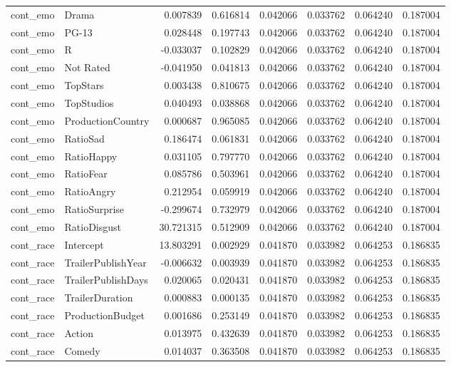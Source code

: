 \begin{tabular}{llrrrrrr}
cont_emo & Drama & 0.007839 & 0.616814 & 0.042066 & 0.033762 & 0.064240 & 0.187004 \\
cont_emo & PG-13 & 0.028448 & 0.197743 & 0.042066 & 0.033762 & 0.064240 & 0.187004 \\
cont_emo & R & -0.033037 & 0.102829 & 0.042066 & 0.033762 & 0.064240 & 0.187004 \\
cont_emo & Not Rated & -0.041950 & 0.041813 & 0.042066 & 0.033762 & 0.064240 & 0.187004 \\
cont_emo & TopStars & 0.003438 & 0.810675 & 0.042066 & 0.033762 & 0.064240 & 0.187004 \\
cont_emo & TopStudios & 0.040493 & 0.038868 & 0.042066 & 0.033762 & 0.064240 & 0.187004 \\
cont_emo & ProductionCountry & 0.000687 & 0.965085 & 0.042066 & 0.033762 & 0.064240 & 0.187004 \\
cont_emo & RatioSad & 0.186474 & 0.061831 & 0.042066 & 0.033762 & 0.064240 & 0.187004 \\
cont_emo & RatioHappy & 0.031105 & 0.797770 & 0.042066 & 0.033762 & 0.064240 & 0.187004 \\
cont_emo & RatioFear & 0.085786 & 0.503961 & 0.042066 & 0.033762 & 0.064240 & 0.187004 \\
cont_emo & RatioAngry & 0.212954 & 0.059919 & 0.042066 & 0.033762 & 0.064240 & 0.187004 \\
cont_emo & RatioSurprise & -0.299674 & 0.732979 & 0.042066 & 0.033762 & 0.064240 & 0.187004 \\
cont_emo & RatioDisgust & 30.721315 & 0.512909 & 0.042066 & 0.033762 & 0.064240 & 0.187004 \\
cont_race & Intercept & 13.803291 & 0.002929 & 0.041870 & 0.033982 & 0.064253 & 0.186835 \\
cont_race & TrailerPublishYear & -0.006632 & 0.003939 & 0.041870 & 0.033982 & 0.064253 & 0.186835 \\
cont_race & TrailerPublishDays & 0.020065 & 0.020431 & 0.041870 & 0.033982 & 0.064253 & 0.186835 \\
cont_race & TrailerDuration & 0.000883 & 0.000135 & 0.041870 & 0.033982 & 0.064253 & 0.186835 \\
cont_race & ProductionBudget & 0.001686 & 0.253149 & 0.041870 & 0.033982 & 0.064253 & 0.186835 \\
cont_race & Action & 0.013975 & 0.432639 & 0.041870 & 0.033982 & 0.064253 & 0.186835 \\
cont_race & Comedy & 0.014037 & 0.363508 & 0.041870 & 0.033982 & 0.064253 & 0.186835 \\

\end{tabular}
